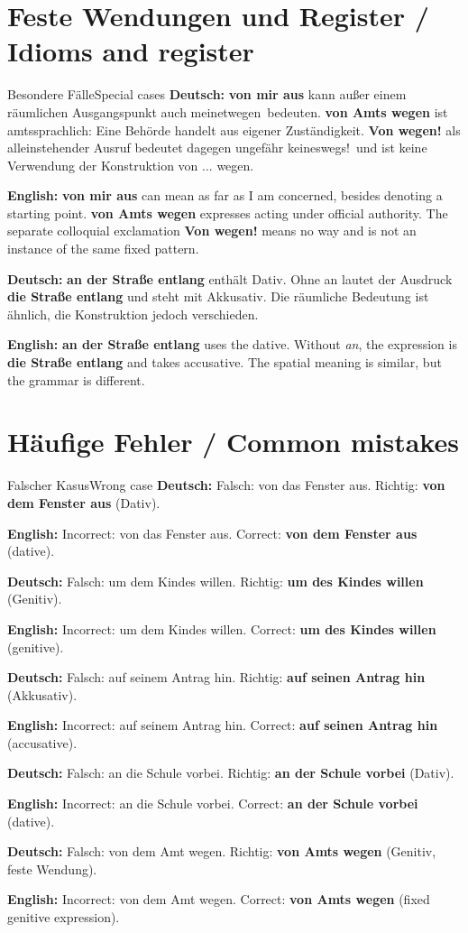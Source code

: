 \documentclass[a4paper,11pt]{article}
\newcommand{\GermanText}[1]{\textbf{Deutsch: }#1\par}
\newcommand{\EnglishText}[1]{{\small\color{SoftGray}\textbf{English: }#1\par}}
\begin{document}
\section{Feste Wendungen und Register / Idioms and register}
\begin{grammarentry}{Besondere Fälle}{Special cases}
\GermanText{\textbf{von mir aus} kann außer einem räumlichen Ausgangspunkt auch \glqq meinetwegen\grqq\ bedeuten. \textbf{von Amts wegen} ist amtssprachlich: Eine Behörde handelt aus eigener Zuständigkeit. \textbf{Von wegen!} als alleinstehender Ausruf bedeutet dagegen ungefähr \glqq keineswegs!\grqq\ und ist keine Verwendung der Konstruktion \glqq von ... wegen\grqq.}
\EnglishText{\textbf{von mir aus} can mean as far as I am concerned, besides denoting a starting point. \textbf{von Amts wegen} expresses acting under official authority. The separate colloquial exclamation \textbf{Von wegen!} means no way and is not an instance of the same fixed pattern.}
\GermanText{\textbf{an der Straße entlang} enthält Dativ. Ohne an lautet der Ausdruck \textbf{die Straße entlang} und steht mit Akkusativ. Die räumliche Bedeutung ist ähnlich, die Konstruktion jedoch verschieden.}
\EnglishText{\textbf{an der Straße entlang} uses the dative. Without \emph{an}, the expression is \textbf{die Straße entlang} and takes accusative. The spatial meaning is similar, but the grammar is different.}
\end{grammarentry}

\section{Häufige Fehler / Common mistakes}
\begin{grammarentry}{Falscher Kasus}{Wrong case}
\GermanText{Falsch: \glqq von das Fenster aus\grqq. Richtig: \textbf{von dem Fenster aus} (Dativ).}
\EnglishText{Incorrect: von das Fenster aus. Correct: \textbf{von dem Fenster aus} (dative).}
\GermanText{Falsch: \glqq um dem Kindes willen\grqq. Richtig: \textbf{um des Kindes willen} (Genitiv).}
\EnglishText{Incorrect: um dem Kindes willen. Correct: \textbf{um des Kindes willen} (genitive).}
\GermanText{Falsch: \glqq auf seinem Antrag hin\grqq. Richtig: \textbf{auf seinen Antrag hin} (Akkusativ).}
\EnglishText{Incorrect: auf seinem Antrag hin. Correct: \textbf{auf seinen Antrag hin} (accusative).}
\GermanText{Falsch: \glqq an die Schule vorbei\grqq. Richtig: \textbf{an der Schule vorbei} (Dativ).}
\EnglishText{Incorrect: an die Schule vorbei. Correct: \textbf{an der Schule vorbei} (dative).}
\GermanText{Falsch: \glqq von dem Amt wegen\grqq. Richtig: \textbf{von Amts wegen} (Genitiv, feste Wendung).}
\EnglishText{Incorrect: von dem Amt wegen. Correct: \textbf{von Amts wegen} (fixed genitive expression).}
\end{grammarentry}
\end{document}
